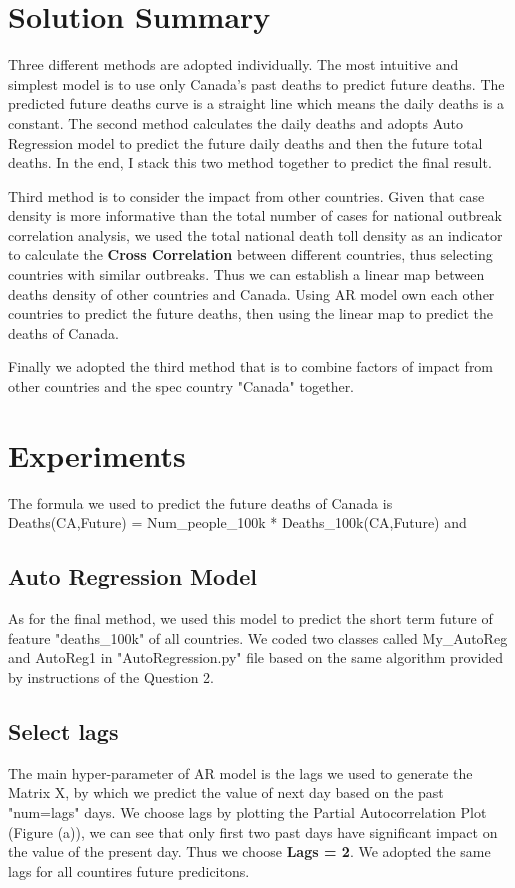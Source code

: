 \section{Solution Summary}
    Three different methods are adopted individually. The most intuitive and simplest model is to use only Canada's past deaths to predict future deaths. The predicted future deaths curve is a straight line which means the daily deaths is a constant. The second method calculates the daily deaths and adopts Auto Regression model to predict the future daily deaths and then the future total deaths. In the end, I stack this two method together to predict the final result.
    
    Third method is to consider the impact from other countries. Given that case density is more informative than the total number of cases for national outbreak correlation analysis, we used the total national death toll density as an indicator to calculate the \textbf{Cross Correlation} between different countries, thus selecting countries with similar outbreaks. Thus we can establish a linear map between deaths density of other countries and Canada. Using AR model own each other countries to predict the future deaths, then using the linear map to predict the deaths of Canada.
    
    Finally we adopted the third method that is to combine factors of impact from other countries and the spec country "Canada" together.
    
\section{Experiments}
The formula we used to predict the future deaths of Canada is  Deaths(CA,Future) = Num\_people\_100k * Deaths\_100k(CA,Future) and 
\subsection{Auto Regression Model}
As for the final method, we used this model to predict the short term future of feature "deaths\_100k" of all countries. We coded two classes called My\_AutoReg and AutoReg1 in "AutoRegression.py" file based on the same algorithm provided by instructions of the Question 2. 
\subsection{Select lags}
The main hyper-parameter of AR model is the lags we used to generate the Matrix X, by which we predict the value of next day based on the past "num=lags" days. We choose lags by plotting the Partial Autocorrelation Plot (Figure (a)), we can see that only first two past days have significant impact on the value of the present day. Thus we choose \textbf{Lags = 2}. We adopted the same lags for all countires future predicitons.

